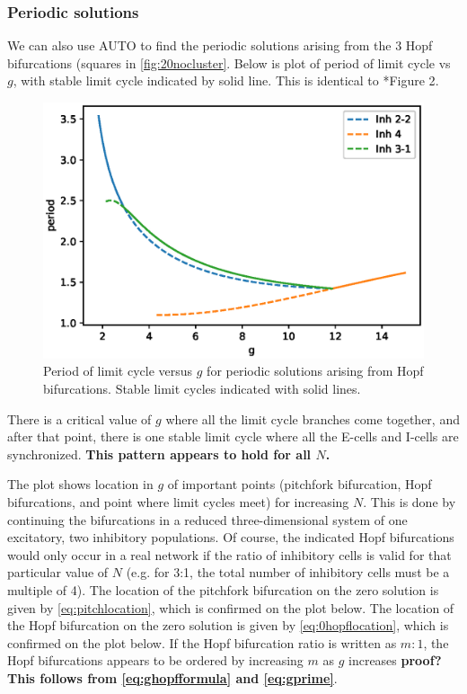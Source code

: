 \documentclass[11pt,reqno]{amsart}
\begin{document}
\subsubsection{Periodic solutions}
We can also use AUTO to find the periodic solutions arising from the 3 Hopf bifurcations (squares in \cref{fig:20nocluster}. Below is plot of period of limit cycle vs $g$, with stable limit cycle indicated by solid line. This is identical to \cite{Barreiro2017}*{Figure 2}.

\begin{figure}[H]
    \centering
    \includegraphics[width=14cm]{images/periodvsg}
    \caption{Period of limit cycle versus $g$ for periodic solutions arising from Hopf bifurcations. Stable limit cycles indicated with solid lines.}
    \label{fig:periodvsg}
\end{figure}

There is a critical value of $g$ where all the limit cycle branches come together, and after that point, there is one stable limit cycle where all the E-cells and I-cells are synchronized.
\textbf{This pattern appears to hold for all $N$.}

The plot shows location in $g$ of important points (pitchfork bifurcation, Hopf bifurcations, and point where limit cycles meet) for increasing $N$. This is done by continuing the bifurcations in a reduced three-dimensional system of one excitatory, two inhibitory populations.  
Of course, the indicated Hopf bifurcations would only occur in a real network if the ratio of inhibitory cells is valid for that particular value of $N$ (e.g. for 3:1, the total number of inhibitory cells must be a multiple of 4). The location of the pitchfork bifurcation on the zero solution is given by \cref{eq:pitchlocation}, which is confirmed on the plot below. The location of the Hopf bifurcation on the zero solution is given by \cref{eq:0hopflocation}, which is confirmed on the plot below. If the Hopf bifurcation ratio is written as $m:1$, the Hopf bifurcations appears to be ordered by increasing $m$ as $g$ increases \textbf{proof? This follows from \cref{eq:ghopfformula} and \cref{eq:gprime}}.
\end{document}
